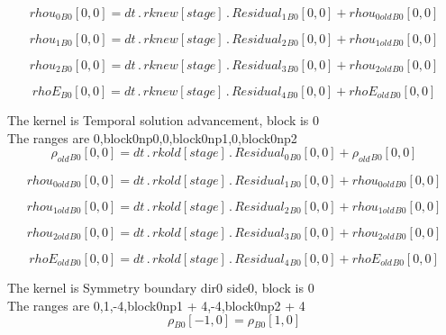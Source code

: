 \documentclass{article}
\begin{document}
\begin{dmath}{rhou_{0}{_{B0}}}[{0,0}] = dt \,.\, {rknew}[{stage}] \,.\, {Residual_{1}{_{B0}}}[{0,0}] + {rhou_{0 old}{_{B0}}}[{0,0}]\end{dmath}

\begin{dmath}{rhou_{1}{_{B0}}}[{0,0}] = dt \,.\, {rknew}[{stage}] \,.\, {Residual_{2}{_{B0}}}[{0,0}] + {rhou_{1 old}{_{B0}}}[{0,0}]\end{dmath}

\begin{dmath}{rhou_{2}{_{B0}}}[{0,0}] = dt \,.\, {rknew}[{stage}] \,.\, {Residual_{3}{_{B0}}}[{0,0}] + {rhou_{2 old}{_{B0}}}[{0,0}]\end{dmath}

\begin{dmath}{rhoE{_{B0}}}[{0,0}] = dt \,.\, {rknew}[{stage}] \,.\, {Residual_{4}{_{B0}}}[{0,0}] + {rhoE_{old}{_{B0}}}[{0,0}]\end{dmath}

\noindent The kernel is Temporal solution advancement, block is 0\\\noindent The ranges are 0,block0np0,0,block0np1,0,block0np2\\\begin{dmath}{\rho_{old}{_{B0}}}[{0,0}] = dt \,.\, {rkold}[{stage}] \,.\, {Residual_{0}{_{B0}}}[{0,0}] + {\rho_{old}{_{B0}}}[{0,0}]\end{dmath}

\begin{dmath}{rhou_{0 old}{_{B0}}}[{0,0}] = dt \,.\, {rkold}[{stage}] \,.\, {Residual_{1}{_{B0}}}[{0,0}] + {rhou_{0 old}{_{B0}}}[{0,0}]\end{dmath}

\begin{dmath}{rhou_{1 old}{_{B0}}}[{0,0}] = dt \,.\, {rkold}[{stage}] \,.\, {Residual_{2}{_{B0}}}[{0,0}] + {rhou_{1 old}{_{B0}}}[{0,0}]\end{dmath}

\begin{dmath}{rhou_{2 old}{_{B0}}}[{0,0}] = dt \,.\, {rkold}[{stage}] \,.\, {Residual_{3}{_{B0}}}[{0,0}] + {rhou_{2 old}{_{B0}}}[{0,0}]\end{dmath}

\begin{dmath}{rhoE_{old}{_{B0}}}[{0,0}] = dt \,.\, {rkold}[{stage}] \,.\, {Residual_{4}{_{B0}}}[{0,0}] + {rhoE_{old}{_{B0}}}[{0,0}]\end{dmath}

\noindent The kernel is Symmetry boundary dir0 side0, block is 0\\\noindent The ranges are 0,1,-4,block0np1 + 4,-4,block0np2 + 4\\\begin{dmath}{\rho{_{B0}}}[{-1,0}] = {\rho{_{B0}}}[{1,0}]\end{dmath}
\end{document}
